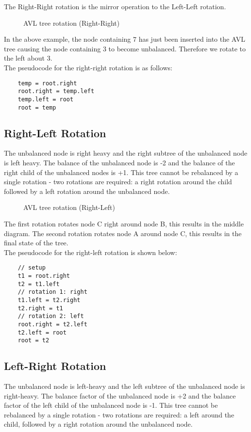 The Right-Right rotation is the mirror operation to the Left-Left rotation.
\begin{figure}[H]
    \centering
    
    \caption{AVL tree rotation (Right-Right)}
\end{figure}

In the above example, the node containing $7$ has just been inserted into the AVL tree causing the node containing $3$ to become unbalanced. Therefore we rotate to the left about 3.\\

The pseudocode for the right-right rotation is as follows:
\begin{verbatim}
    temp = root.right
    root.right = temp.left
    temp.left = root
    root = temp
\end{verbatim}

\subsection{Right-Left Rotation}
The unbalanced node is right heavy and the right subtree of the unbalanced node is left heavy. The balance of the unbalanced node is -2 and the balance of the right child of the unbalanced nodes is +1. This tree cannot be rebalanced by a single rotation - two rotations are required: a right rotation around the child followed by a left rotation around the unbalanced node.

\begin{figure}[H]
    \centering
    
    \caption{AVL tree rotation (Right-Left)}
\end{figure}

The first rotation rotates node C right around node B, this results in the middle diagram. The second rotation rotates node A around node C, this results in the final state of the tree.\\

The pseudocode for the right-left rotation is shown below:
\begin{verbatim}
    // setup
    t1 = root.right
    t2 = t1.left
    // rotation 1: right
    t1.left = t2.right
    t2.right = t1
    // rotation 2: left
    root.right = t2.left
    t2.left = root
    root = t2
\end{verbatim}

\subsection{Left-Right Rotation}
The unbalanced node is left-heavy and the left subtree of the unbalanced node is right-heavy. The balance factor of the unbalanced node is +2 and the balance factor of the left child of the unbalanced node is -1. This tree cannot be rebalanced by a single rotation - two rotations are required: a left around the child, followed by a right rotation around the unbalanced node.

